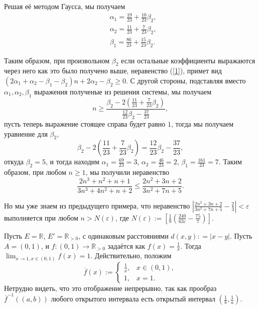 \begin{example}
Решая её методом Гаусса, мы получаем
\begin{align*}
    &\alpha_1 = \frac{19}{23}+\frac{10}{23} \beta_2,\\
    & \alpha_2 = \frac{11}{23} + \frac{7}{23} \beta_2,\\
    & \beta_1 = \frac{86}{23} + \frac{15}{23} \beta_2.
\end{align*}

Таким образом, при произвольном $\beta_2$ если остальные коэффициенты выражаются через него как это было получено выше, неравенство (\ref{1}), примет вид $(2\alpha_1 +\alpha_2 -\beta_1 -\beta_2)n  + 2\alpha_2 -\beta_2 \ge 0$. С другой стороны, подставляя вместо $\alpha_1,\alpha_2,\beta_1$ выражения полученые из решения системы, мы получаем
\[
 n \ge \frac{\beta_2 - 2 \left( \frac{11}{23} + \frac{7}{23} \beta_2 \right)}{\frac{12}{23}\beta_2 -\frac{37}{23}},
\]
пусть теперь выражение стоящее справа будет равно $1$, тогда мы получаем уравнение для $\beta_2$,
\[
\beta_2 - 2 \left( \frac{11}{23} + \frac{7}{23} \beta_2 \right) = \frac{12}{23}\beta_2 -\frac{37}{23},
\]
откуда $\beta_2 = 5$, и тогда находим $\alpha_1 = \frac{69}{23} = 3$, $\alpha_2 = \frac{46}{23} = 2$, $\beta_1 = \frac{161}{23} = 7$. Таким образом, при любом $n\ge 1$, мы получили неравенство
\[
 \frac{2n^3 +n^2+n+1}{3n^3+4n^2+n +2} \le \frac{2n^2 + 3 n +2}{3n^2 + 7n +5}.
\]

Но мы уже знаем из предыдущего примера, что неравенство $\left| \frac{2n^2 + 3 n +2}{3n^2 + 7n +5} - \frac{2}{3} \right|<\varepsilon$ выполняется при любом $n>N(\varepsilon)$, где $N(\varepsilon):=\left[\frac{1}{9}\left( \frac{240}{63\varepsilon} - \frac{75}{7} \right) \right].$

\end{example}


    \item Пусть $E = \mathbb{R}$, $E' =\mathbb{R}_{>0}$, с одинаковым расстояниями $d(x,y): = |x-y|$. Пусть $A = (0,1)$, и $f:(0,1) \to \mathbb{R}_{>0}$ задаётся как $f(x) = \frac{1}{x}$. Тогда $\lim_{x \to 1, x \in (0,1)}f(x)  = 1$. Действительно, положим 
    \[
     \overline{f}(x):=\begin{cases}
         \frac{1}{x}, & x \in (0,1), \\
         1, & x = 1.
     \end{cases}
    \]
Нетрудно видеть, что это отображение непрерывно, так как прообраз $\overline{f}^{-1}((a,b))$ любого открытого интервала есть открытый интервал $(\frac{1}{b},\frac{1}{a})$.

\newpage





